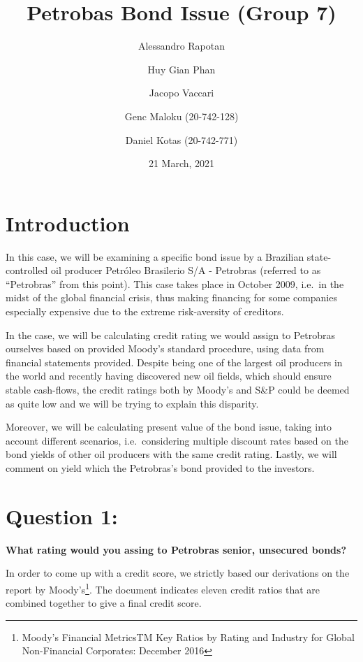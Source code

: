 \documentclass[
]{article}
\title{Petrobas Bond Issue (Group 7)}
\author{Alessandro Rapotan \and Huy Gian Phan \and Jacopo
Vaccari \and Genc Maloku (20-742-128) \and Daniel Kotas (20-742-771)}
\date{21 March, 2021}
\begin{document}
\maketitle

\hypertarget{introduction}{%
\section{Introduction}\label{introduction}}

In this case, we will be examining a specific bond issue by a Brazilian
state-controlled oil producer Petróleo Brasilerio S/A - Petrobras
(referred to as ``Petrobras'' from this point). This case takes place in
October 2009, i.e.~in the midst of the global financial crisis, thus
making financing for some companies especially expensive due to the
extreme risk-aversity of creditors.

In the case, we will be calculating credit rating we would assign to
Petrobras ourselves based on provided Moody's standard procedure, using
data from financial statements provided. Despite being one of the
largest oil producers in the world and recently having discovered new
oil fields, which should ensure stable cash-flows, the credit ratings
both by Moody's and S\&P could be deemed as quite low and we will be
trying to explain this disparity.

Moreover, we will be calculating present value of the bond issue, taking
into account different scenarios, i.e.~considering multiple discount
rates based on the bond yields of other oil producers with the same
credit rating. Lastly, we will comment on yield which the Petrobras's
bond provided to the investors.

\hypertarget{question-1}{%
\section{Question 1:}\label{question-1}}

\textbf{What rating would you assing to Petrobras senior, unsecured
bonds?}

In order to come up with a credit score, we strictly based our
derivations on the report by Moody's\footnote{Moody's Financial
  MetricsTM Key Ratios by Rating and Industry for Global Non-Financial
  Corporates: December 2016}. The document indicates eleven credit
ratios that are combined together to give a final credit score.
\end{document}
